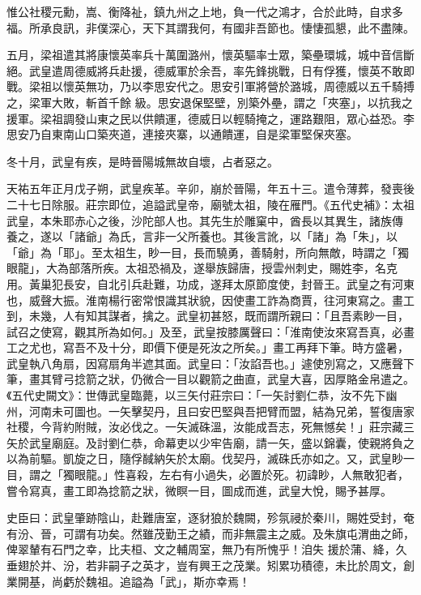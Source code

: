 \begin{pinyinscope}
 惟公社稷元勳，嵩、衡降祉，鎮九州之上地，負一代之鴻才，合於此時，自求多福。所承良訊，非僕深心，天下其謂我何，有國非吾節也。悽悽孤懇，此不盡陳。



 五月，梁祖遣其將康懷英率兵十萬圍潞州，懷英驅率士眾，築壘環城，城中音信斷絕。武皇遣周德威將兵赴援，德威軍於余吾，率先鋒挑戰，日有俘獲，懷英不敢即戰。梁祖以懷英無功，乃以李思安代之。思安引軍將營於潞城，周德威以五千騎搏之，梁軍大敗，斬首千餘
 級。思安退保堅壁，別築外壘，謂之「夾塞」，以抗我之援軍。梁祖調發山東之民以供饋運，德威日以輕騎掩之，運路艱阻，眾心益恐。李思安乃自東南山口築夾道，連接夾寨，以通饋運，自是梁軍堅保夾塞。



 冬十月，武皇有疾，是時晉陽城無故自壞，占者惡之。



 天祐五年正月戊子朔，武皇疾革。辛卯，崩於晉陽，年五十三。遣令薄葬，發喪後二十七日除服。莊宗即位，追謚武皇帝，廟號太祖，陵在雁門。《五代史補》：太祖武皇，本朱耶赤心之後，沙陀部人也。其先生於雕窠中，酋長以其異生，諸族傳
 養之，遂以「諸爺」為氏，言非一父所養也。其後言訛，以「諸」為「朱」，以「爺」為「耶」。至太祖生，眇一目，長而驍勇，善騎射，所向無敵，時謂之「獨眼龍」，大為部落所疾。太祖恐禍及，遂舉族歸唐，授雲州刺史，賜姓李，名克用。黃巢犯長安，自北引兵赴難，功成，遂拜太原節度使，封晉王。武皇之有河東也，威聲大振。淮南楊行密常恨識其狀貌，因使畫工詐為商賈，往河東寫之。畫工到，未幾，人有知其謀者，擒之。武皇初甚怒，既而謂所親曰：「且吾素眇一目，試召之使寫，觀其所為如何。」及至，武皇按膝厲聲曰：「淮南使汝來寫吾真，必畫工之尤也，寫吾不及十分，即價下便是死汝之所矣。」畫工再拜下筆。時方盛暑，武皇執八角扇，因寫扇角半遮其面。武皇曰：「汝諂吾也。」遽使別寫之，又應聲下筆，畫其臂弓捻箭之狀，仍微合一目以觀箭之曲直，武皇大喜，因厚賂金帛遣之。《五代史闕文》：世傳武皇臨薨，以三矢付莊宗曰：「一矢討劉仁恭，汝不先下幽
 州，河南未可圖也。一矢擊契丹，且曰安巴堅與吾把臂而盟，結為兄弟，誓復唐家社稷，今背約附賊，汝必伐之。一矢滅硃溫，汝能成吾志，死無憾矣！」莊宗藏三矢於武皇廟庭。及討劉仁恭，命幕吏以少牢告廟，請一矢，盛以錦囊，使親將負之以為前驅。凱旋之日，隨俘馘納矢於太廟。伐契丹，滅硃氏亦如之。又，武皇眇一目，謂之「獨眼龍。」性喜殺，左右有小過失，必置於死。初諱眇，人無敢犯者，嘗令寫真，畫工即為捻箭之狀，微瞑一目，圖成而進，武皇大悅，賜予甚厚。



 史臣曰：武皇肇跡陰山，赴難唐室，逐豺狼於魏闕，殄氛祲於秦川，賜姓受封，奄有汾、晉，可謂有功矣。然雖茂勤王之績，而非無震主之威。及朱旗屯渭曲之師，俾翠輦有石門之幸，比夫桓、文之輔周室，無乃有所愧乎！洎失
 援於蒲、絳，久垂翅於并、汾，若非嗣子之英才，豈有興王之茂業。矧累功積德，未比於周文，創業開基，尚虧於魏祖。追謚為「武」，斯亦幸焉！



\end{pinyinscope}